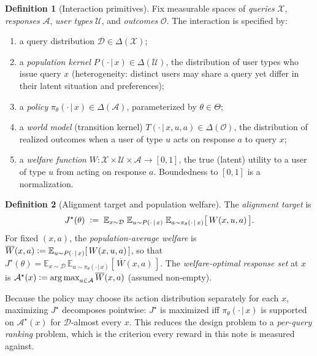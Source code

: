 \documentclass[11pt]{article}
\theoremstyle{plain}
\theoremstyle{definition}
\newtheorem{definition}{Definition}
\theoremstyle{remark}
\newcommand{\E}{\mathbb{E}}
\newcommand{\Xc}{\mathcal{X}}
\newcommand{\Ac}{\mathcal{A}}
\newcommand{\Uc}{\mathcal{U}}
\newcommand{\Oc}{\mathcal{O}}
\newcommand{\Dc}{\mathcal{D}}
\newcommand{\Wbar}{\overline{W}}
\newcommand{\policy}{\pi_{\theta}}
\newcommand{\given}{\,\vert\,}
\DeclareMathOperator*{\argmax}{arg\,max}
\newcommand{\defeq}{\vcentcolon=}
\begin{document}
\begin{definition}[Interaction primitives]
\label{def:primitives}
Fix measurable spaces of \emph{queries} $\Xc$, \emph{responses} $\Ac$, \emph{user types}
$\Uc$, and \emph{outcomes} $\Oc$. The interaction is specified by:
\begin{enumerate}[label=(\roman*),leftmargin=2.2em,itemsep=1pt,topsep=2pt]
  \item a query distribution $\Dc\in\Delta(\Xc)$;
  \item a \emph{population kernel} $P(\cdot\given x)\in\Delta(\Uc)$, the distribution of user
  types who issue query $x$ (heterogeneity: distinct users may share a query yet differ in
  their latent situation and preferences);
  \item a \emph{policy} $\policy(\cdot\given x)\in\Delta(\Ac)$, parameterized by
  $\theta\in\Theta$;
  \item a \emph{world model} (transition kernel) $T(\cdot\given x,u,a)\in\Delta(\Oc)$, the
  distribution of realized outcomes when a user of type $u$ acts on response $a$ to query
  $x$;
  \item a \emph{welfare function} $W:\Xc\times\Uc\times\Ac\to[0,1]$, the true (latent) utility
  to a user of type $u$ from acting on response $a$. Boundedness to $[0,1]$ is a
  normalization.
\end{enumerate}
\end{definition}

\begin{definition}[Alignment target and population welfare]
\label{def:target}
The \emph{alignment target} is
\[
  J^\star(\theta)
  \;\defeq\;
  \E_{x\sim\Dc}\;\E_{u\sim P(\cdot\given x)}\;\E_{a\sim\policy(\cdot\given x)}
  \big[\,W(x,u,a)\,\big].
\]
For fixed $(x,a)$, the \emph{population-average welfare} is
$\Wbar(x,a)\defeq\E_{u\sim P(\cdot\given x)}[\,W(x,u,a)\,]$, so that
$J^\star(\theta)=\E_{x\sim\Dc}\,\E_{a\sim\policy(\cdot\given x)}[\,\Wbar(x,a)\,]$. The
\emph{welfare-optimal response set} at $x$ is
$\Ac^\star(x)\defeq\argmax_{a\in\Ac}\Wbar(x,a)$ (assumed non-empty).
\end{definition}

Because the policy may choose its action distribution separately for each $x$, maximizing
$J^\star$ decomposes pointwise: $J^\star$ is maximized iff $\policy(\cdot\given x)$ is
supported on $\Ac^\star(x)$ for $\Dc$-almost every $x$. This reduces the design problem to a
\emph{per-query ranking} problem, which is the criterion every reward in this note is
measured against.
\end{document}
